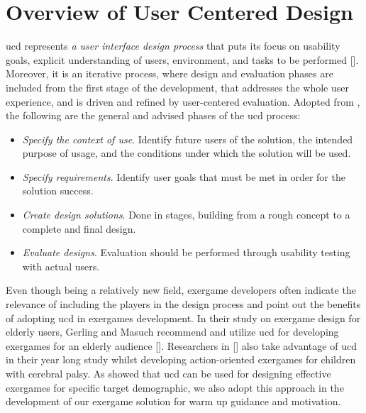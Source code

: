 \section{Overview of User Centered Design}
\gls{ucd} represents \textit{a user interface design process} that puts its focus on usability goals, explicit understanding of users, environment, and tasks to be performed []. Moreover, it is an iterative process, where design and evaluation phases are included from the first stage of the development, that addresses the whole user experience, and is driven and refined by user-centered evaluation. %
Adopted from \cite{userCenteredDesign}, the following are the general and advised phases of the \acrshort{ucd} process:
\begin{itemize}
\item \textit{Specify the context of use}. Identify future users of the solution, the intended purpose of usage, and the conditions under which the solution will be used.
\item \textit{Specify requirements}. Identify user goals that must be met in order for the solution success.
\item \textit{Create design solutions}. Done in stages, building from a rough concept to a complete and final design.
\item \textit{Evaluate designs}. Evaluation should be performed through usability testing with actual users.
\end{itemize}
Even though being a relatively new field, exergame developers often indicate the relevance of including the players in the design process and point out the benefits of adopting \acrshort{ucd} in exergames development. In their study on exergame design for elderly users, Gerling and Masuch recommend and utilize \acrshort{ucd} for developing exergames for an elderly audience []. Researchers in [] also take advantage of \acrshort{ucd} in their year long study whilst developing action-oriented exergames for children with cerebral palsy. As showed that \acrshort{ucd} can be used for designing effective exergames for specific target demographic, we also adopt this approach in the development of our exergame solution for warm up guidance and motivation.
